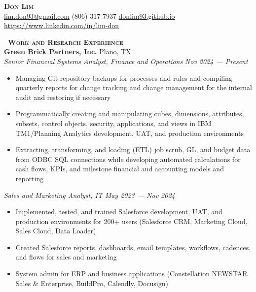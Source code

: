 \documentclass[a4paper,11pt]{article}
\newcommand{\header} [1] {
    \vspace{1mm}
    {\textsc{\textbf{\large{\xrfill[0.5ex]{0.5pt}~#1~\xrfill[0.5ex]{0.5pt}}}}} %
}
\begin{document}
\vspace*{-45pt}
\fontsize{10.5}{11.5}\selectfont


\vspace*{1mm}
\begin{center}
    {\Huge\textbf\textsc{{{Don Lim}}}}\\ \vspace{1mm}
    \href{mailto:lim.don93@gmail.com}{lim.don93@gmail.com}  (806) 317-7937  \href{https://donlim93.github.io/}{donlim93.github.io}  \href{https://www.linkedin.com/in/lim-don/}{https://www.linkedin.com/in/lim-don} \\
\end{center}
\vspace*{-2mm}

\header{Work and Research Experience} \\
\vspace{1mm}
\textbf{Green Brick Partners, Inc.} \hfill Plano, TX \\
\textit{Senior Financial Systems Analyst, Finance and Operations} \hfill \textit{Nov 2024 --- Present} \\
\begin{itemize}
    \item Managing Git repository backups for processes and rules and compiling quarterly reports for change tracking and change management for the internal audit and restoring if necessary
    \item Programmatically creating and manipulating cubes, dimensions, attributes, subsets, control objects, security, applications, and views in IBM TM1/Planning Analytics development, UAT, and production environments
    \item Extracting, transforming, and loading (ETL) job scrub, GL, and budget data from ODBC SQL connections while developing automated calculations for cash flows, KPIs, and milestone financial and accounting models and reporting 
\end{itemize}
\vspace{1mm}


\textit{Sales and Marketing Analyst, IT} \hfill  \textit{May 2023 --- Nov 2024} \\
\begin{itemize}
    \item Implemented, tested, and trained Salesforce development, UAT, and production environments for 200+ users (Salesforce CRM, Marketing Cloud, Sales Cloud, Data Loader) 
    \item Created Salesforce reports, dashboards, email templates, workflows, cadences, and flows for sales and marketing
    \item System admin for ERP and business applications (Constellation NEWSTAR Sales \& Enterprise, BuildPro, Calendly, Docusign)
\end{itemize}
\vspace{1mm}
\end{document}
